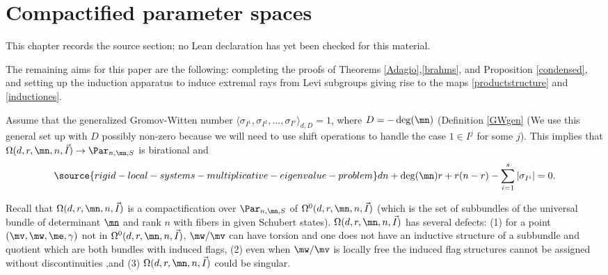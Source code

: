 \chapter{Compactified parameter spaces}
\label{rigid-local-systems-multiplicative-eigenvalue-problem-chapter-08}

\begin{remark}
\label{rigid-local-systems-multiplicative-eigenvalue-problem-chapter-08-source}
This chapter records the source section; no Lean declaration has yet been checked for this material.
\notready
\end{remark}

\label{compact}
The remaining aims for this paper are the following: completing the proofs of Theorems \ref{Adagio},\ref{brahms}, and Proposition \ref{condensed}, and  setting up the induction apparatus to induce extremal rays from Levi subgroups giving rise to the maps \eqref{productstructure} and \eqref{inductiones}.

Assume that the generalized Gromov-Witten number $\langle\sigma_{I^1}, \sigma_{I^2},\dots,\sigma_{I^s}\rangle_{d,D}=1$, where $D=-\deg(\mn)$ (Definition  \ref{GWgen} (We use this general set up with $D$ possibly non-zero because we will need to use shift operations to handle the case $1\in I^j$ for some $j$). This implies that $\Omega(d,r,\mn,n,\vec{I})\to \Par_{n,\mn,S}$ is birational and
\begin{equation}\label{timer1}
\source{rigid-local-systems-multiplicative-eigenvalue-problem}
dn +\deg(\mn)r +r(n-r)-\sum_{i=1}^s |\sigma_{I^i}|=0.
\end{equation}

Recall that  $\Omega(d,r,\mn,n,\vec{I})$ is a compactification over $\Par_{n,\mn,S}$ of $\Omega^0(d,r,\mn,n,\vec{I})$ (which is the set of subbundles of the universal bundle of determinant $\mn$ and rank $n$ with fibers in given Schubert states). $\Omega(d,r,\mn,n,\vec{I})$ has several defects: (1) for a  point $(\mv,\mw,\me,\gamma)$ not in $\Omega^0(d,r,\mn,n,\vec{I})$,  $\mw/\mv$ can have torsion and one does not have an inductive structure of a  subbundle and quotient which are both bundles with induced flags, (2) even when $\mw/\mv$ is locally free the induced flag structures cannot be assigned without discontinuities ,and (3) $\Omega(d,r,\mn,n,\vec{I})$ could be singular.


